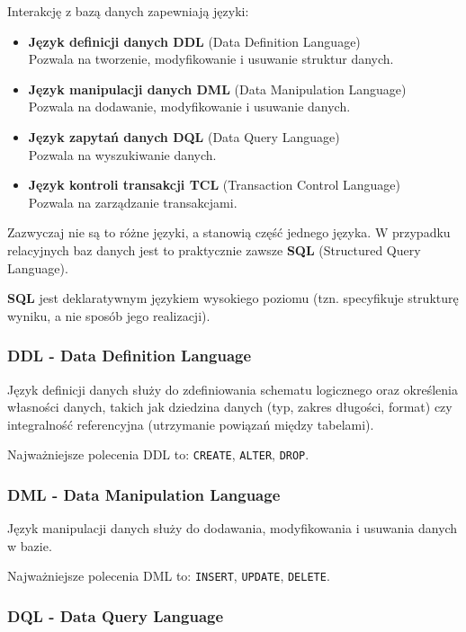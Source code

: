 Interakcję z bazą danych zapewniają języki:

\begin{itemize}
    \item \textbf{Język definicji danych DDL} (Data Definition Language) \\
    Pozwala na tworzenie, modyfikowanie i usuwanie struktur danych.
    \item \textbf{Język manipulacji danych DML} (Data Manipulation Language) \\
    Pozwala na dodawanie, modyfikowanie i usuwanie danych.
    \item \textbf{Język zapytań danych DQL} (Data Query Language) \\
    Pozwala na wyszukiwanie danych.
    \item \textbf{Język kontroli transakcji TCL} (Transaction Control Language) \\
    Pozwala na zarządzanie transakcjami.
\end{itemize}

Zazwyczaj nie są to różne języki, a stanowią część jednego języka.
W przypadku relacyjnych baz danych jest to praktycznie zawsze \textbf{SQL} (Structured Query Language).

\textbf{SQL} jest deklaratywnym językiem wysokiego poziomu (tzn. specyfikuje strukturę wyniku, a nie sposób jego realizacji).

\subsubsection{DDL - Data Definition Language}

Język definicji danych służy do zdefiniowania schematu logicznego oraz określenia własności danych, takich jak dziedzina danych (typ, zakres długości, format) czy integralność referencyjna (utrzymanie powiązań między tabelami).

Najważniejsze polecenia DDL to: \texttt{CREATE}, \texttt{ALTER}, \texttt{DROP}.

\subsubsection{DML - Data Manipulation Language}

Język manipulacji danych służy do dodawania, modyfikowania i usuwania danych w bazie.

Najważniejsze polecenia DML to: \texttt{INSERT}, \texttt{UPDATE}, \texttt{DELETE}.

\subsubsection{DQL - Data Query Language}

